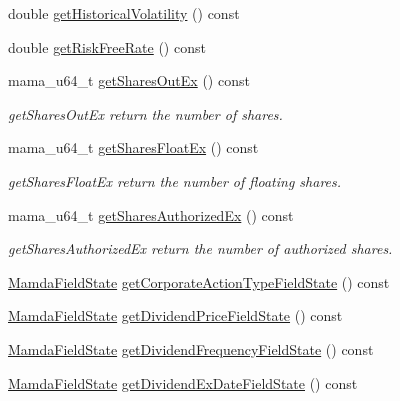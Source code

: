 \begin{CompactItemize}
double \hyperlink{classWombat_1_1MamdaFundamentalListener_975c5df94470d5d3a50f04f9bf86a741}{get\-Historical\-Volatility} () const 
\item 
double \hyperlink{classWombat_1_1MamdaFundamentalListener_7ee4b7ae2fa8cf35ff7892a7bb2831ef}{get\-Risk\-Free\-Rate} () const 
\item 
mama\_\-u64\_\-t \hyperlink{classWombat_1_1MamdaFundamentalListener_2dff10a145ad0a1e0b8e3223720eead2}{get\-Shares\-Out\-Ex} () const 
\begin{CompactList}\small\item\em get\-Shares\-Out\-Ex return the number of shares. \item\end{CompactList}\item 
mama\_\-u64\_\-t \hyperlink{classWombat_1_1MamdaFundamentalListener_c37c3fa41884972b67e1abbabeddb9f5}{get\-Shares\-Float\-Ex} () const 
\begin{CompactList}\small\item\em get\-Shares\-Float\-Ex return the number of floating shares. \item\end{CompactList}\item 
mama\_\-u64\_\-t \hyperlink{classWombat_1_1MamdaFundamentalListener_338972a5c68467e1464b62b59ef19af7}{get\-Shares\-Authorized\-Ex} () const 
\begin{CompactList}\small\item\em get\-Shares\-Authorized\-Ex return the number of authorized shares. \item\end{CompactList}\item 
\hyperlink{namespaceWombat_93aac974f2ab713554fd12a1fa3b7d2a}{Mamda\-Field\-State} \hyperlink{classWombat_1_1MamdaFundamentalListener_990406da217bef790753e65c47d558df}{get\-Corporate\-Action\-Type\-Field\-State} () const 
\item 
\hyperlink{namespaceWombat_93aac974f2ab713554fd12a1fa3b7d2a}{Mamda\-Field\-State} \hyperlink{classWombat_1_1MamdaFundamentalListener_8b5f8895f97cf0e559325348e99bc1bb}{get\-Dividend\-Price\-Field\-State} () const 
\item 
\hyperlink{namespaceWombat_93aac974f2ab713554fd12a1fa3b7d2a}{Mamda\-Field\-State} \hyperlink{classWombat_1_1MamdaFundamentalListener_ef68fbedac7b4c18d2883a381faa3c70}{get\-Dividend\-Frequency\-Field\-State} () const 
\item 
\hyperlink{namespaceWombat_93aac974f2ab713554fd12a1fa3b7d2a}{Mamda\-Field\-State} \hyperlink{classWombat_1_1MamdaFundamentalListener_d36dbb75077ac135466024235858667d}{get\-Dividend\-Ex\-Date\-Field\-State} () const 

\end{CompactItemize}
